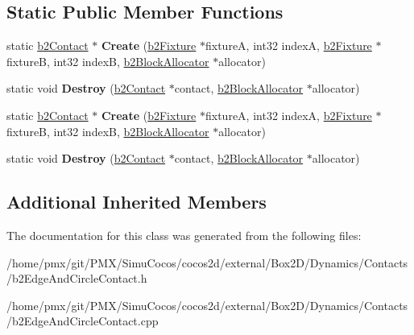 \subsection*{Static Public Member Functions}
\begin{DoxyCompactItemize}
\item 
\mbox{\label{classb2EdgeAndCircleContact_a1b4a2a1d4098288c84a7778a4949d0f0}} 
static \hyperlink{classb2Contact}{b2\+Contact} $\ast$ {\bfseries Create} (\hyperlink{classb2Fixture}{b2\+Fixture} $\ast$fixtureA, int32 indexA, \hyperlink{classb2Fixture}{b2\+Fixture} $\ast$fixtureB, int32 indexB, \hyperlink{classb2BlockAllocator}{b2\+Block\+Allocator} $\ast$allocator)
\item 
\mbox{\label{classb2EdgeAndCircleContact_a123eeb8144b01fc15c1318eacd0da4ca}} 
static void {\bfseries Destroy} (\hyperlink{classb2Contact}{b2\+Contact} $\ast$contact, \hyperlink{classb2BlockAllocator}{b2\+Block\+Allocator} $\ast$allocator)
\item 
\mbox{\label{classb2EdgeAndCircleContact_ad253e184d26e54c60fa874b329f9737e}} 
static \hyperlink{classb2Contact}{b2\+Contact} $\ast$ {\bfseries Create} (\hyperlink{classb2Fixture}{b2\+Fixture} $\ast$fixtureA, int32 indexA, \hyperlink{classb2Fixture}{b2\+Fixture} $\ast$fixtureB, int32 indexB, \hyperlink{classb2BlockAllocator}{b2\+Block\+Allocator} $\ast$allocator)
\item 
\mbox{\label{classb2EdgeAndCircleContact_a7d77dd43691dad8d813450aefdb1e11e}} 
static void {\bfseries Destroy} (\hyperlink{classb2Contact}{b2\+Contact} $\ast$contact, \hyperlink{classb2BlockAllocator}{b2\+Block\+Allocator} $\ast$allocator)
\end{DoxyCompactItemize}
\subsection*{Additional Inherited Members}


The documentation for this class was generated from the following files\+:\begin{DoxyCompactItemize}
\item 
/home/pmx/git/\+P\+M\+X/\+Simu\+Cocos/cocos2d/external/\+Box2\+D/\+Dynamics/\+Contacts/b2\+Edge\+And\+Circle\+Contact.\+h\item 
/home/pmx/git/\+P\+M\+X/\+Simu\+Cocos/cocos2d/external/\+Box2\+D/\+Dynamics/\+Contacts/b2\+Edge\+And\+Circle\+Contact.\+cpp\end{DoxyCompactItemize}
